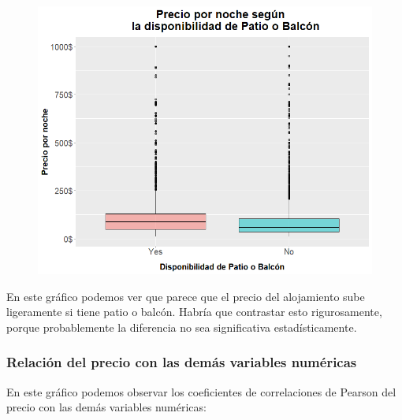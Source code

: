 \documentclass{article}
\begin{document}
\vspace{0.35cm}
\begin{figure}[h]
\hspace*{-0.15cm}
\centering
\includegraphics[scale = 0.6]{boxplot_precio_Patio_or_balcony}
\end{figure}
\vspace{0.15cm}

En este gráfico podemos ver que parece que el precio del alojamiento sube ligeramente si tiene patio o balcón. Habría que contrastar esto rigurosamente, porque probablemente la diferencia no sea significativa estadísticamente.

\clearpage
\subsubsection{Relación del precio con las demás variables numéricas}

En este gráfico podemos observar los coeficientes de correlaciones de Pearson del precio con las demás variables numéricas:
\end{document}
